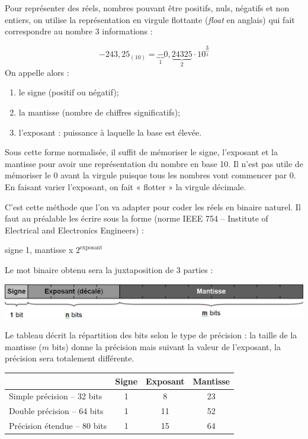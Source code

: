 \documentclass[10pt,fleqn]{article} %
\begin{document}
Pour représenter des réels, nombres pouvant être positifs, nuls, négatifs et non entiers, on utilise la représentation en virgule flottante (\textit{float} en anglais) qui fait correspondre au nombre 3 informations :

$$
-243,25_{(10)} = \underbrace{-}_{1}0,\underbrace{24325}_{2}\cdot10^{\underbrace{3}_{3}}
$$
On appelle alors : 
\begin{enumerate}
\item le signe (positif ou négatif);
\item la mantisse (nombre de chiffres significatifs);
\item l'exposant : puissance à laquelle la base est élevée. 
\end{enumerate}

Sous cette forme normalisée, il suffit de mémoriser le signe, l’exposant et la mantisse pour avoir une représentation du nombre en base 10. Il n’est pas utile de mémoriser le 0 avant la virgule puisque tous les nombres vont commencer par 0. En faisant varier l’exposant, on fait « flotter » la virgule décimale.

C’est cette méthode que l’on va adapter pour coder les réels en binaire naturel. Il faut au préalable les écrire sous la forme (norme IEEE 754 – Institute of Electrical and Electronics Engineers) :

\begin{center}
signe 1, mantisse x $2^{\text{exposant}}$
\end{center}

Le mot binaire obtenu sera la juxtaposition de 3 parties :

\begin{center}
\includegraphics[width=.7\textwidth]{images/reel_1}
\end{center}


\begin{minipage}[c]{.4\linewidth}
Le tableau décrit la répartition des bits selon le type de précision : la taille de la mantisse ($m$ bits) donne la précision mais suivant la valeur de l'exposant, la précision sera totalement différente. 


\end{minipage}\hfill
\begin{minipage}[c]{.59\linewidth}
\begin{center}
\begin{tabular}{| l |c|c|c|}
\hline

& Signe & Exposant & Mantisse \\ \hline
 Simple précision -- 32 bits & 1 & 8 & 23 \\ \hline
 Double précision -- 64 bits & 1 & 11 & 52 \\ \hline
 Précision étendue -- 80 bits & 1 & 15 & 64 \\ \hline
\end{tabular}
\end{center}
\end{minipage}
\end{document}
